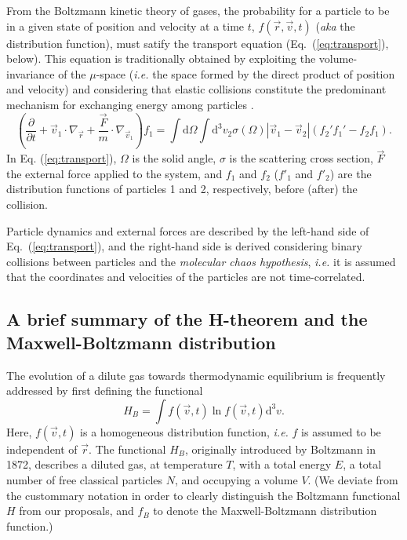 From the Boltzmann kinetic theory of gases, the probability for a particle to be in a given
state of position and velocity at a time $t$,
$f(\vec r,\vec v,t)$ (\textit{aka} the distribution function), must satify
the transport equation (Eq.~(\ref{eq:transport}), below).
This equation is traditionally obtained by exploiting the volume-invariance of the $\mu$-space
(\textit{i.e.} the space formed by the direct product of position and velocity)
and considering that elastic collisions constitute the predominant mechanism
for exchanging energy among particles \cite{bib:huang}.
%
\begin{equation}\label{eq:transport}
  \left(
    \frac{\partial}{\partial t}+\vec{v}_1 \cdot\nabla_{\vec r}
    +\frac{\vec{F}}{m}\cdot\nabla_{\vec v_1}
  \right)f_1=\int\mathrm{d}\Omega\int
    \mathrm{d}^{3}v_2\sigma(\Omega)|\vec{v}_1-\vec{v}_2|(f_2'f_1'-f_2f_1).
\end{equation}
%
In Eq. (\ref{eq:transport}), $\Omega$ is the solid angle, $\sigma$ is the
scattering cross section, $\vec F$ the
external force applied to the system, and $f_1$ and $f_2$ ($f'_1$ and $f'_2$) are the distribution
functions of particles 1 and 2, respectively, before (after) the collision.

Particle dynamics and external forces are described
by the left-hand side of Eq.~(\ref{eq:transport}), and the right-hand side
is derived considering binary collisions between particles and
the \textit{molecular chaos hypothesis}, \textit{i.e.} it is assumed that
the coordinates and velocities of the particles are not time-correlated.


\subsection{A brief summary of the H-theorem and the Maxwell-Boltzmann distribution}

The evolution of a dilute gas towards thermodynamic equilibrium is frequently
addressed by first defining the functional \cite{bib:tolman,bib:huang}
%
\begin{equation}\label{eq:hbfunctional}
   H_{B}=\int f(\vec{v},t) \ln f(\vec{v},t) \mathrm{d}^{3}v.
\end{equation} 
%
Here, $f(\vec{v},t)$ is a homogeneous distribution function, \textit{i.e.}
$f$ is assumed to be independent of $\vec r$.
The functional $H_B$,
originally introduced by Boltzmann in 1872,
describes a diluted gas, at temperature $T$, with a total energy $E$, a total
number of free classical particles $N$, and occupying a volume $V$.
(We deviate from the custommary notation in order to
clearly distinguish the Boltzmann functional $H$ from our proposals, and
$f_B$ to denote the Maxwell-Boltzmann distribution function.)

